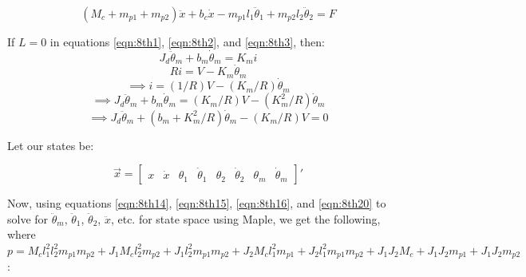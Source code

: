 \documentclass{article}
\begin{document}
\begin{equation}
(M_c + m_{p1} + m_{p2}) \ddot{x} + b_c \dot{x} - m_{p1} l_1 \ddot{\theta}_1 + m_{p2} l_2 \ddot{\theta}_2 = F
\label{eqn:8th16}
\end{equation}

If $L = 0$ in equations \ref{eqn:8th1}, \ref{eqn:8th2}, and \ref{eqn:8th3}, then:
\begin{equation*}
J_d \ddot{\theta}_m + b_m \dot{\theta}_m = K_m i
\end{equation*}
\begin{equation*}
R i = V - K_m \dot{\theta}_m
\end{equation*}
\begin{equation}
\implies i = (1/R) V - (K_m/R) \dot{\theta}_m
\label{eqn:i}
\end{equation}
\begin{equation*}
\implies J_d \ddot{\theta}_m + b_m \dot{\theta}_m = (K_m/R) V - (K_m^2/R) \dot{\theta}_m
\end{equation*}
\begin{equation}
\implies J_d \ddot{\theta}_m + (b_m + K_m^2/R) \dot{\theta}_m - (K_m/R) V = 0
\label{eqn:8th20}
\end{equation}

Let our states be:

\begin{equation*}
\vec{x} = \begin{bmatrix}
x & \dot{x} & \theta_1 & \dot{\theta}_1 & \theta_2 & \dot{\theta}_2 & \theta_m & \dot{\theta}_m
\end{bmatrix} '
\end{equation*}

Now, using equations \ref{eqn:8th14}, \ref{eqn:8th15}, \ref{eqn:8th16}, and \ref{eqn:8th20} to solve for $\ddot{\theta}_m$, $\ddot{\theta}_1$, $\ddot{\theta}_2$, $\ddot{x}$, etc. for state space using Maple, we get the following, where $p = M_c l_1^2 l_2^2 m_{p1} m_{p2}+J_1 M_c l_2^2 m_{p2}+J_1 l_2^2 m_{p1} m_{p2}+J_2 M_c l_1^2 m_{p1}+J_2 l_1^2 m_{p1} m_{p2}+J_1 J_2 M_c+J_1 J_2 m_{p1}+J_1 J_2 m_{p2}$:
\end{document}
